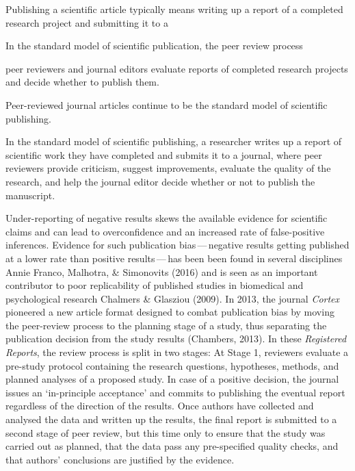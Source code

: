 \documentclass[
  ,man,mask,floatsintext]{apa6}
\begin{document}
Publishing a scientific article typically means writing up a report of a completed research project and submitting it to a

In the standard model of scientific publication, the peer review process

peer reviewers and journal editors evaluate reports of completed research projects and decide whether to publish them.

Peer-reviewed journal articles continue to be the standard model of scientific publishing.

In the standard model of scientific publishing, a researcher writes up a report of scientific work they have completed and submits it to a journal, where peer reviewers provide criticism, suggest improvements, evaluate the quality of the research, and help the journal editor decide whether or not to publish the manuscript.

Under-reporting of negative results skews the available evidence for scientific claims and can lead to overconfidence and an increased rate of false-positive inferences.
Evidence for such publication bias\(\,\)---\(\,\)negative results getting published at a lower rate than positive results\(\,\)---\(\,\)has been been found in several disciplines Annie Franco, Malhotra, \& Simonovits (2016) and is seen as an important contributor to poor replicability of published studies in biomedical and psychological research Chalmers \& Glasziou (2009).
In 2013, the journal \emph{Cortex} pioneered a new article format designed to combat publication bias by moving the peer-review process to the planning stage of a study, thus separating the publication decision from the study results (Chambers, 2013).
In these \emph{Registered Reports}, the review process is split in two stages:
At Stage 1, reviewers evaluate a pre-study protocol containing the research questions, hypotheses, methods, and planned analyses of a proposed study.
In case of a positive decision, the journal issues an `in-principle acceptance' and commits to publishing the eventual report regardless of the direction of the results.
Once authors have collected and analysed the data and written up the results, the final report is submitted to a second stage of peer review, but this time only to ensure that the study was carried out as planned, that the data pass any pre-specified quality checks, and that authors' conclusions are justified by the evidence.
\end{document}
